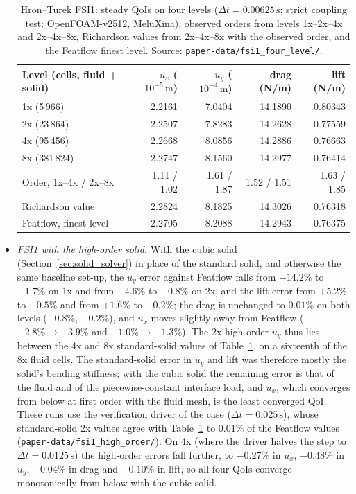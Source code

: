 \begin{itemize}
\begin{table}[htbp]
	\centering
	\footnotesize
	\caption{Hron--Turek FSI1: steady QoIs on four levels ($\Delta t = 0.00625\,\mathrm{s}$; strict coupling test; OpenFOAM-v2512, MeluXina), observed orders from levels 1x--2x--4x and 2x--4x--8x, Richardson values from 2x--4x--8x with the observed order, and the Featflow finest level. Source: \texttt{paper-data/fsi1\_four\_level/}.}
	\label{tab:fsi1}
	\begin{tabular}{lrrrr}
		\toprule
		Level (cells, fluid + solid) & $u_x$ ($10^{-5}\,\mathrm{m}$) & $u_y$ ($10^{-4}\,\mathrm{m}$) & drag (N/m) & lift (N/m) \\
		\midrule
		1x (5\,966) & 2.2161 & 7.0404 & 14.1890 & 0.80343 \\
		2x (23\,864) & 2.2507 & 7.8283 & 14.2628 & 0.77559 \\
		4x (95\,456) & 2.2668 & 8.0856 & 14.2886 & 0.76663 \\
		8x (381\,824) & 2.2747 & 8.1560 & 14.2977 & 0.76414 \\
		\midrule
		Order, 1x--4x / 2x--8x & 1.11 / 1.02 & 1.61 / 1.87 & 1.52 / 1.51 & 1.63 / 1.85 \\
		Richardson value & 2.2824 & 8.1825 & 14.3026 & 0.76318 \\
		Featflow, finest level & 2.2705 & 8.2088 & 14.2943 & 0.76375 \\
		\bottomrule
	\end{tabular}
\end{table}
	\item \emph{FSI1 with the high-order solid.} With the cubic solid (Section~\ref{sec:solid_solver}) in place of the standard solid, and otherwise the same baseline set-up, the $u_y$ error against Featflow falls from $-14.2\%$ to $-1.7\%$ on 1x and from $-4.6\%$ to $-0.8\%$ on 2x, and the lift error from $+5.2\%$ to $-0.5\%$ and from $+1.6\%$ to $-0.2\%$; the drag is unchanged to $0.01\%$ on both levels ($-0.8\%$, $-0.2\%$), and $u_x$ moves slightly away from Featflow ($-2.8\%\to-3.9\%$ and $-1.0\%\to-1.3\%$). The 2x high-order $u_y$ thus lies between the 4x and 8x standard-solid values of Table~\ref{tab:fsi1}, on a sixteenth of the 8x fluid cells. The standard-solid error in $u_y$ and lift was therefore mostly the solid's bending stiffness; with the cubic solid the remaining error is that of the fluid and of the piecewise-constant interface load, and $u_x$, which converges from below at first order with the fluid mesh, is the least converged QoI. These runs use the verification driver of the case ($\Delta t = 0.025\,\mathrm{s}$), whose standard-solid 2x values agree with Table~\ref{tab:fsi1} to $0.01\%$ of the Featflow values (\texttt{paper-data/fsi1\_high\_order/}). On 4x (where the driver halves the step to $\Delta t = 0.0125\,\mathrm{s}$) the high-order errors fall further, to $-0.27\%$ in $u_x$, $-0.48\%$ in $u_y$, $-0.04\%$ in drag and $-0.10\%$ in lift, so all four QoIs converge monotonically from below with the cubic solid.

\end{itemize}
